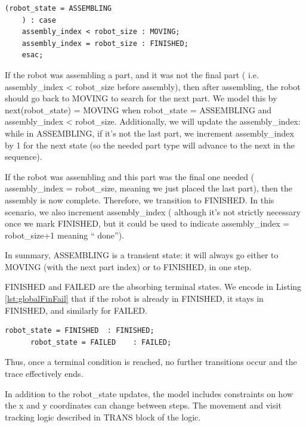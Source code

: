 \begin{lstlisting}[language=NuSMV, caption={Assign for transitions from ASSEMBLING state}, 
    label={lst:globalAssembling}]
    (robot_state = ASSEMBLING
    ) : case 
    assembly_index < robot_size : MOVING;
    assembly_index = robot_size : FINISHED;
    esac;
\end{lstlisting}

If the robot was assembling a part, and it was not the final part (
i.e. assembly\_index < robot\_size before assembly), then after assembling, 
the robot should go back to MOVING to search for the next part. We 
model this by next(robot\_state) = MOVING when robot\_state = ASSEMBLING and 
assembly\_index < robot\_size. Additionally, we will update the assembly\_index: while 
in ASSEMBLING, if it’s not the last part, we increment assembly\_index by 
1 for the next state (so the needed part type will advance to the next 
in the sequence).

If the robot was assembling and this part was the final one needed (
assembly\_index = robot\_size, meaning we just placed the last part), 
then the assembly is now complete. 
Therefore, we transition to FINISHED.
In this scenario, we also increment assembly\_index (
although it’s not strictly necessary once we mark FINISHED, but it 
could be used to indicate assembly\_index = robot\_size+1 meaning “
done”).

In summary, ASSEMBLING is a transient state: it will always go either to 
MOVING (with the next part index) or to FINISHED, in one step.

FINISHED and FAILED are the absorbing terminal states. We encode in Listing \ref{lst:globalFinFail} 
that if the robot is already in FINISHED, it stays in FINISHED, and similarly for FAILED. 

\begin{lstlisting}[language=NuSMV, caption={Terminal conditions for FINISHED and FAILED}, 
    label={lst:globalFinFail}]
      robot_state = FINISHED  : FINISHED;
      robot_state = FAILED    : FAILED;
\end{lstlisting}

Thus, once a terminal condition is reached, no further transitions occur 
and the trace effectively ends.



In addition to the robot\_state updates, the model includes constraints on 
how the x and y coordinates can change between steps. 
The movement and visit tracking logic described in TRANS block of the logic. 

